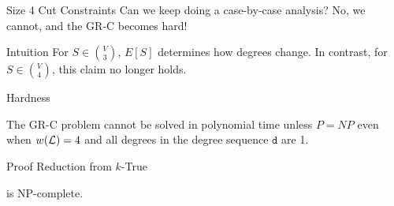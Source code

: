 \begin{frame}{Size 4 Cut Constraints}
    \centering
    \Large
    Can we keep doing a case-by-case analysis?
    \pause
    \bigbreak
    No, we cannot, and the GR-C becomes hard!
\end{frame}

\begin{frame}{Intuition}
    \centering
    \Large
    For $S \in \binom{V}{3}$, $E[S]$ determines how degrees change.
    \pause
    \bigbreak
    In contrast, for $S \in \binom{V}{4}$, this claim no longer holds.
\end{frame}

\begin{frame}{Hardness}
    \centering
    \begin{theorem}[3]
        The GR-C problem cannot be solved in polynomial time unless $P = NP$ even when $w(\mathcal{L}) = 4$ and all degrees in the degree sequence $\texttt{d}$ are 1.
    \end{theorem}
\end{frame}

\begin{frame}{Proof}
    \centering
    \Large
    Reduction from $k$-True \rXthreeSAT{}
\end{frame}

\begin{frame}{\rXthreeSAT{}}
    \beamerdefaultoverlayspecification{}
\end{frame}

\begin{frame}{\rXthreeSAT{}}
    \begin{lemma}[2]
        \rXthreeSAT{} is NP-complete.
    \end{lemma}
\end{frame}

\begin{frame}{\kXthreeSAT{}}
\end{frame}

